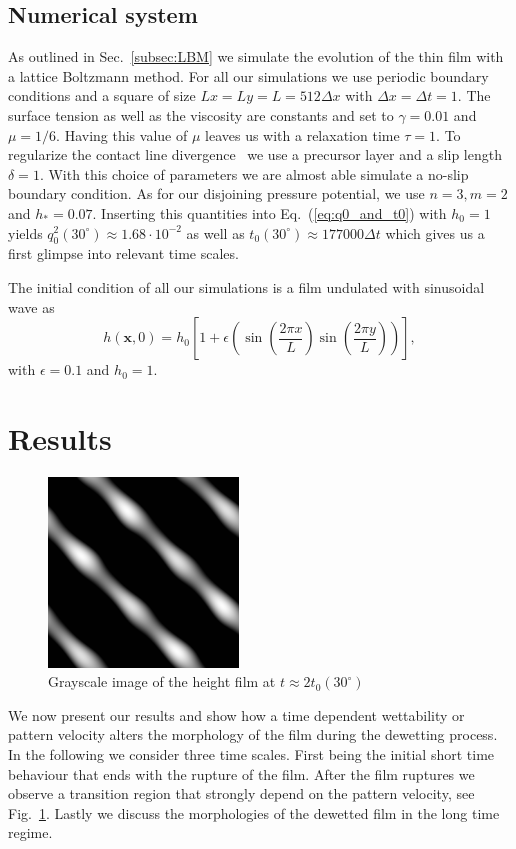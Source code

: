 \documentclass[twocolumn,amsmath,amssymb,showpacs,pre,nofootinbib,superscriptaddress]{revtex4-1} %
\begin{document}
\subsection{Numerical system}
As outlined in Sec.~\ref{subsec:LBM} we simulate the evolution of the thin film with a lattice Boltzmann method.
For all our simulations we use periodic boundary conditions and a square of size $Lx = Ly = L = 512 \Delta x$ with $\Delta x = \Delta t = 1$.
The surface tension as well as the viscosity are constants and set to $\gamma = 0.01$ and $\mu = 1/6$.
Having this value of $\mu$ leaves us with a relaxation time $\tau = 1$.
To regularize the contact line divergence~\cite{huh1971hydrodynamic} we use a precursor layer and a slip length $\delta = 1$. 
With this choice of parameters we are almost able simulate a no-slip boundary condition.
As for our disjoining pressure potential, we use $n=3, m=2$ and $h_{\ast} = 0.07$.
Inserting this quantities into Eq.~(\ref{eq:q0_and_t0}) with $h_0 = 1$ yields $q_0^2(30^{\circ}) \approx 1.68\cdot10^{-2}$ as well as $t_0(30^{\circ}) \approx 177000\Delta t$ which gives us a first glimpse into relevant time scales.

The initial condition of all our simulations is a film undulated with sinusoidal wave as
\begin{equation}\label{eq:hinitial}
    h(\mathbf{x},0) = h_0 \left[1 + \epsilon \left(\sin\left(\frac{2\pi x}{L}\right)\sin\left(\frac{2\pi y}{L}\right)\right)\right],
\end{equation}
with $\epsilon = 0.1$ and $h_0 = 1$.

\section{Results}\label{sec:results}
\begin{figure}
    \centering
    \includegraphics[width=0.45\textwidth]{Figures/theta_0336.png}
    \caption{Grayscale image of the height film at $t\approx 2t_0(30^{\circ})$}
    \label{fig:gray_ligament}
\end{figure}
We now present our results and show how a time dependent wettability or pattern velocity alters the morphology of the film during the dewetting process.
In the following we consider three time scales.
First being the initial short time behaviour that ends with the rupture of the film.
After the film ruptures we observe a transition region that strongly depend on the pattern velocity, see Fig.~\ref{fig:gray_ligament}.
Lastly we discuss the morphologies of the dewetted film in the long time regime.
\end{document}
